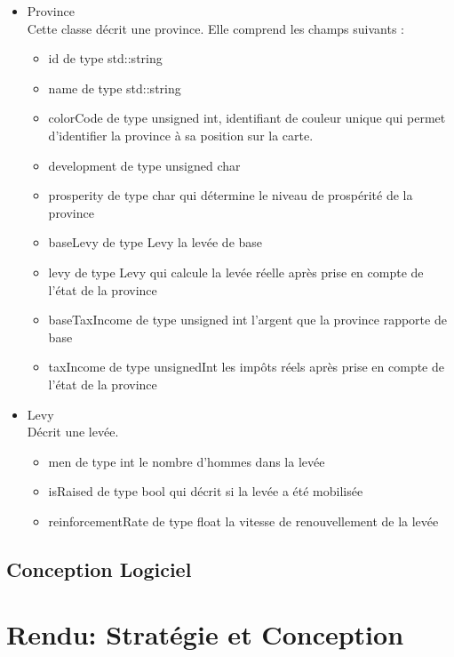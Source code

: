 \documentclass[a4paper,12pt]{article}
\begin{document}
\begin{itemize}
\item Province\\
Cette classe décrit une province. Elle comprend les champs suivants :
\begin{itemize}
\item id de type std::string
\item name de type std::string
\item colorCode de type unsigned int, identifiant de couleur unique qui permet d'identifier la province à sa position sur la carte.
\item development de type unsigned char
\item prosperity de type char qui détermine le niveau de prospérité de la province
\item baseLevy de type Levy la levée de base
\item levy de type Levy qui calcule la levée réelle après prise en compte de l'état de la province
\item baseTaxIncome de type unsigned int l'argent que la province rapporte de base
\item taxIncome de type unsignedInt les impôts réels après prise en compte de l'état de la province
\end{itemize}
\item Levy\\
Décrit une levée.
\begin{itemize}
\item men de type int le nombre d'hommes dans la levée
\item isRaised de type bool qui décrit si la levée a été mobilisée
\item reinforcementRate de type float la vitesse de renouvellement de la levée
\end{itemize}
\end{itemize}

\subsection{Conception Logiciel}


\clearpage
\section{Rendu: Stratégie et Conception}
\end{document}
